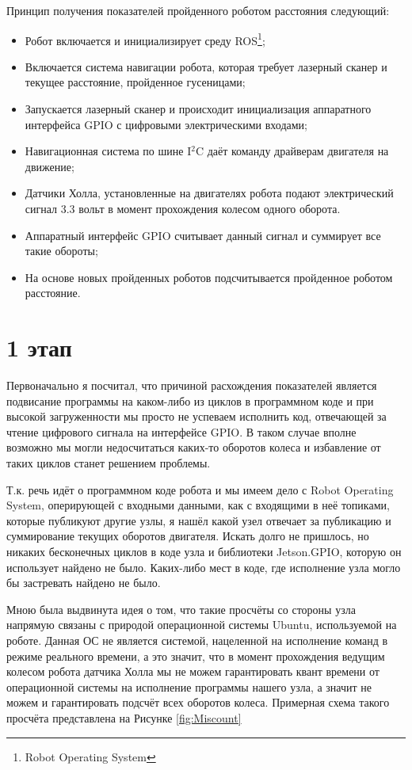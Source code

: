 \documentclass[12pt,a4paper]{scrartcl}
\begin{document}
			Принцип получения показателей пройденного роботом расстояния следующий:
			\begin{itemize}
				\item Робот включается и инициализирует среду ROS\footnote{Robot Operating System};
				\item Включается система навигации робота, которая требует лазерный сканер и текущее расстояние, пройденное гусеницами;
				\item Запускается лазерный сканер и происходит инициализация аппаратного интерфейса GPIO с цифровыми электрическими входами;
				\item Навигационная система по шине I$^2$C даёт команду драйверам двигателя на движение;
				\item Датчики Холла, установленные на двигателях робота подают электрический сигнал 3.3 вольт в момент прохождения колесом одного оборота.
				\item Аппаратный интерфейс GPIO считывает данный сигнал и суммирует все такие обороты;
				\item На основе новых пройденных роботов подсчитывается пройденное роботом расстояние.
			\end{itemize}
			
		\section*{1 этап}
			Первоначально я посчитал, что причиной расхождения показателей является подвисание программы на каком-либо из циклов в программном коде и при высокой загруженности мы просто не успеваем исполнить код, отвечающей за чтение цифрового сигнала на интерфейсе GPIO. В таком случае вполне возможно мы могли недосчитаться каких-то оборотов колеса и избавление от таких циклов станет решением проблемы.
			
			Т.к. речь идёт о программном коде робота и мы имеем дело с Robot Operating System, оперирующей с входными данными, как с входящими в неё топиками, которые публикуют другие узлы, я нашёл какой узел отвечает за публикацию и суммирование текущих оборотов двигателя. Искать долго не пришлось, но никаких бесконечных циклов в коде узла и библиотеки Jetson.GPIO, которую он использует найдено не было. Каких-либо мест в коде, где исполнение узла могло бы застревать найдено не было. 
			
			Мною была выдвинута идея о том, что такие просчёты со стороны узла напрямую связаны с природой операционной системы Ubuntu, используемой на роботе. Данная ОС не является системой, нацеленной на исполнение команд в режиме реального времени, а это значит, что в момент прохождения ведущим колесом робота датчика Холла мы не можем гарантировать квант времени от операционной системы на исполнение программы нашего узла, а значит не можем и гарантировать подсчёт всех оборотов колеса. Примерная схема такого просчёта представлена на Рисунке \ref{fig:Miscount}
			
\end{document}
